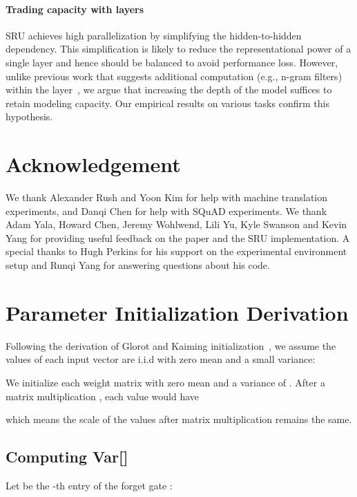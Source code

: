 \documentclass[11pt,a4paper]{article}
\begin{document}
\paragraph{Trading capacity with layers}
SRU achieves high parallelization by simplifying the hidden-to-hidden dependency.
This simplification is likely to reduce the representational power of a single layer and hence should be balanced to avoid performance loss. 
However, unlike previous work that suggests additional computation (e.g., n-gram filters) within the layer~\citep{BalduzziG16,bradbury2016quasi}, we argue that increasing the depth of the model suffices to retain modeling capacity.
Our empirical results on various tasks confirm this hypothesis.

 \section*{Acknowledgement}
We thank Alexander Rush and Yoon Kim for help with machine translation experiments, and Danqi Chen for help with SQuAD experiments.
We thank Adam Yala, Howard Chen, Jeremy Wohlwend, Lili Yu, Kyle Swanson and Kevin Yang for providing useful feedback on the paper and the SRU implementation.
A special thanks to Hugh Perkins for his support on the experimental environment setup and Runqi Yang for answering questions about his code.%
 



\clearpage
\newpage
\appendix
\section{Parameter Initialization Derivation}
\label{sec:appendix:init}

Following the derivation of Glorot and Kaiming initialization~\cite{glorot2010understanding,he2015delving}, we assume the values of each input vector  are i.i.d with zero mean and a small variance:

We initialize each weight matrix with zero mean and a variance of .
After a matrix multiplication , each value  would have

which means the scale of the values after matrix multiplication remains the same.

\subsection{Computing Var[]}
Let  be the -th entry of the forget gate :
\end{document}
